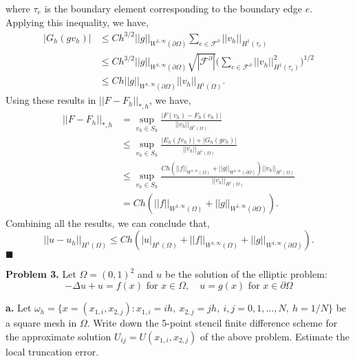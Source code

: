\documentclass[11pt]{article}
\begin{document}
where $\tau_e$ is the boundary element corresponding to the boundary edge $e$.
Applying this inequality, we have,
\begin{align*}
    |G_h(gv_h)| &\leq Ch^{3/2} ||g||_{W^{1,\infty}(\partial \Omega)} \sum_{e \in \mathcal{F}^\partial} ||v_h||_{H^1(\tau_e)} \\
	&\leq Ch^{3/2} ||g||_{W^{1,\infty}(\partial \Omega)} \sqrt{|\mathcal{F}^\partial|} \Big( \sum_{e \in \mathcal{F}^\partial} ||v_h||^2_{H^1(\tau_e)} \Big)^{1/2} \\
    &\leq C h ||g||_{W^{1,\infty}(\partial \Omega)} ||v_h||_{H^1(\Omega)}.
\end{align*}
Using these results in $||F - F_h||_{*,h}$, we have,
\begin{align*}
    ||F - F_h||_{*,h} &= \sup_{v_h \in S_h} \frac{|F(v_h) - F_h(v_h)|}{||v_h||_{H^1(\Omega)}} \\ 
    &\leq \sup_{v_h \in S_h} \frac{|E_h(fv_h)| + |G_h(gv_h)|}{||v_h||_{H^1(\Omega)}} \\
    &\leq \sup_{v_h \in S_h} \frac{Ch(||f||_{W^{1,\infty}(\Omega)} + ||g||_{W^{1,\infty}(\partial\Omega)}) ||v_h||_{H^1(\Omega)}}{||v_h||_{H^1(\Omega)}} \\
    &= C h (||f||_{W^{1,\infty}(\Omega)} + ||g||_{W^{1,\infty}(\partial\Omega)}).
\end{align*}
Combining all the results, we can conclude that,
\begin{equation*}
    ||u - u_h||_{H^1(\Omega)} \leq Ch ( |u|_{H^1(\Omega)} + ||f||_{W^{1,\infty}(\Omega)} + ||g||_{W^{1,\infty}(\partial\Omega)} ).
\end{equation*}
$\blacksquare$


\vskip 2cm


\textbf{Problem 3.} Let $\Omega = (0, 1)^2$ and $u$ be the solution of the elliptic problem:
\begin{equation}
    -\Delta u + u = f(x) \text{ for } x \in \Omega, \quad u = g(x) \text{ for } x \in \partial\Omega
\end{equation}

\vskip 0.5cm


\textbf{a.} Let $\omega_h = \{x = (x_{1,i}, x_{2,j} ) : x_{1,i} = ih, \: x_{2,j} = jh, \: i, j = 0, 1, . . . , N,\: h = 1/N\}$ be a square mesh in $\Omega$.
Write down the 5-point stencil finite difference scheme for the approximate solution $U_{ij} = U(x_{1,i}, x_{2,j} )$ of the above problem. 
Estimate the local truncation error.

\vskip 1cm
\end{document}
